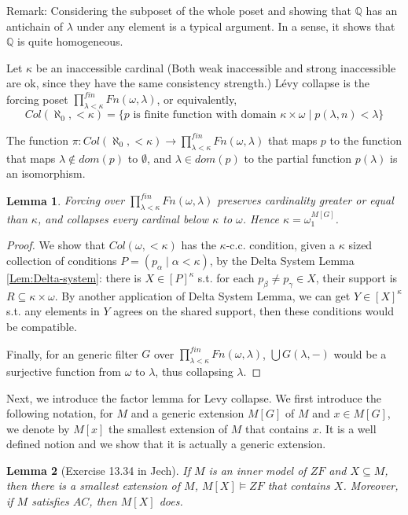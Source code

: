 \documentclass{article}
\newtheorem{lemma}{Lemma}
\newcommand{\bbQ}{\mathbb{Q}}
\begin{document}
Remark: Considering the subposet of the whole poset and showing that $\bbQ$ has an antichain of $\lambda$ under any element is a typical argument. In a sense, it shows that $\bbQ$ is quite homogeneous. 

Let $\kappa$ be an inaccessible cardinal (Both weak inaccessible and strong inaccessible are ok, since they have the same consistency strength.) L\'evy collapse is the forcing poset $\prod^{fin}_{\lambda<\kappa}Fn(\omega, \lambda)$, or equivalently, $$Col(\aleph_0,<\kappa) = \{p\text{ is finite function with domain }\kappa \times \omega\mid p(\lambda,n)<\lambda\}$$

The function 
$\pi: Col(\aleph_0,<\kappa)\to \prod^{fin}_{\lambda<\kappa}Fn(\omega, \lambda)$ that maps $p$ to the function that maps $\lambda\not\in dom(p)$ to $\emptyset$, and $\lambda\in dom(p)$ to the partial function $p(\lambda)$ is an isomorphism.

\begin{lemma}
    Forcing over $\prod^{fin}_{\lambda<\kappa}Fn(\omega, \lambda)$ preserves cardinality greater or equal than $\kappa$, and collapses every cardinal below $\kappa$ to $\omega$. Hence $\kappa = \omega_1^{M[G]}$.
\end{lemma}

\begin{proof}
    We show that $Col(\omega,<\kappa)$ has the $\kappa$-c.c. condition, given a $\kappa$ sized collection of conditions $P = (p_\alpha\mid \alpha<\kappa)$, by the Delta System Lemma \ref{Lem:Delta-system}: there is $X \in [P]^\kappa$ s.t. for each $p_\beta\neq p_\gamma\in X$, their support is $R\subseteq \kappa\times \omega$. By another application of Delta System Lemma, we can get $Y\in [X]^\kappa$ s.t. any elements in $Y$ agrees on the shared support, then these conditions would be compatible.

    Finally, for an generic filter $G$ over $\prod^{fin}_{\lambda<\kappa}Fn(\omega, \lambda)$, $\bigcup G(\lambda,-)$ would be a surjective function from $\omega$ to $\lambda$, thus collapsing $\lambda$.
\end{proof}

Next, we introduce the factor lemma for Levy collapse. We first introduce the following notation, for $M$ and a generic extension $M[G]$ of $M$ and $x\in M[G]$, we denote by $M[x]$ the smallest extension of $M$ that contains $x$. It is a well defined notion and we show that it is actually a generic extension.


\begin{lemma}[Exercise 13.34 in Jech]
    If $M$ is an inner model of $ZF$ and $X\subseteq M$, then there is a smallest extension of $M$, $M[X]\models ZF$ that contains $X$. Moreover, if $M$ satisfies $AC$, then $M[X]$ does.
\end{lemma}
\end{document}

